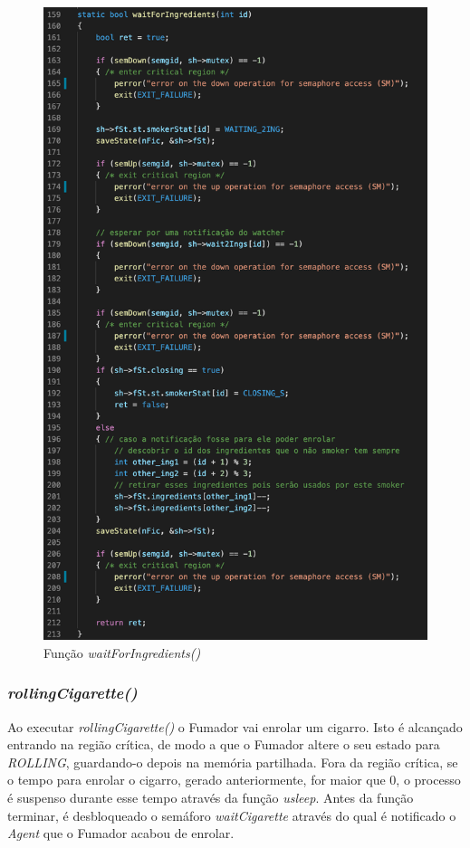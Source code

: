 \documentclass[10pt,portuguese]{article}
\begin{document}
\begin{figure}[!h]
    \centering
    \includegraphics[scale=0.7]{images/implementation/waitforings.png}
    \caption{Função \textit{waitForIngredients()}}
\end{figure}

\clearpage

\subsubsection{\textit{rollingCigarette()}}

\par Ao executar \textit{rollingCigarette()} o Fumador vai enrolar um cigarro. Isto é alcançado entrando na região crítica, de modo a que o Fumador altere o seu estado para \textit{ROLLING}, guardando-o depois na memória partilhada. Fora da região crítica, se o tempo para enrolar o cigarro, gerado anteriormente, for maior que 0, o processo é suspenso durante esse tempo através da função \textit{usleep}. Antes da função terminar, é desbloqueado o semáforo \textit{waitCigarette} através do qual é notificado o \textit{Agent} que o Fumador acabou de enrolar.
\end{document}
